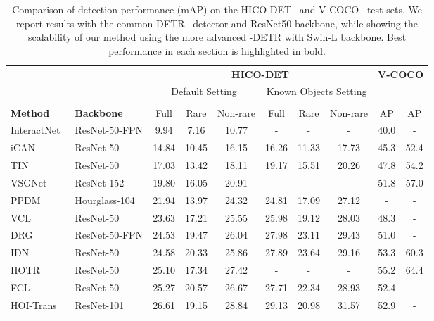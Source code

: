 \documentclass[10pt,twocolumn,letterpaper]{article}
\begin{document}
\begin{table*}[t]\small
   \centering
    \caption{Comparison of detection performance (mAP) on the HICO-DET~\cite{hicodet} and V-COCO~\cite{vcoco} test sets. We report results with the common DETR~\cite{detr} detector and ResNet50 backbone, while showing the scalability of our method using the more advanced -DETR with Swin-L backbone. Best performance in each section is highlighted in bold.}
    \label{tab:results}
    \begin{tabularx}{\linewidth}{@{\extracolsep{\fill}} l l cccccccc}
       \toprule
     & & \multicolumn{6}{c}{\textbf{HICO-DET}} & \multicolumn{2}{c}{\textbf{V-COCO}} \\ [4pt]
     & & \multicolumn{3}{c}{Default Setting} & \multicolumn{3}{c}{Known Objects Setting} & & \\ 
     \cline{3-5}\cline{6-8}\cline{9-10} \\ [-8pt]
       \textbf{Method} & \textbf{Backbone} & Full & Rare & Non-rare & Full & Rare & Non-rare & AP & AP \\
       \midrule
      InteractNet~\cite{interactnet} & ResNet-50-FPN & 9.94 & 7.16 & 10.77 & - & - & - & 40.0 & - \\
      iCAN~\cite{ican} & ResNet-50 & 14.84 & 10.45 & 16.15 & 16.26 & 11.33 & 17.73 & 45.3 & 52.4 \\
      TIN~\cite{tin} & ResNet-50 & 17.03 & 13.42 & 18.11 & 19.17 & 15.51 & 20.26 & 47.8 & 54.2 \\
      VSGNet~\cite{vsgnet} & ResNet-152 & 19.80 & 16.05 & 20.91 & - & - & - & 51.8 & 57.0 \\
      PPDM~\cite{ppdm} & Hourglass-104 & 21.94 & 13.97 & 24.32 & 24.81 & 17.09 & 27.12 & - & - \\
      VCL~\cite{vcl} & ResNet-50 & 23.63 & 17.21 & 25.55 & 25.98 & 19.12 & 28.03 & 48.3 & - \\
      DRG~\cite{drg} & ResNet-50-FPN & 24.53 & 19.47 & 26.04 & 27.98 & 23.11 & 29.43 & 51.0 & - \\
      IDN~\cite{idn} & ResNet-50 & 24.58 & 20.33 & 25.86 & 27.89 & 23.64 & 29.16 & 53.3 & 60.3 \\
      HOTR~\cite{hotr} & ResNet-50 & 25.10 & 17.34 & 27.42 & - & - & - & 55.2 & 64.4 \\
      FCL~\cite{fcl} & ResNet-50 & 25.27 & 20.57 & 26.67 & 27.71 & 22.34 & 28.93 & 52.4 & - \\
      HOI-Trans~\cite{hoitrans} & ResNet-101 & 26.61 & 19.15 & 28.84 & 29.13 & 20.98 & 31.57 & 52.9 & - \\

\end{tabularx}
\end{table*}
\end{document}
